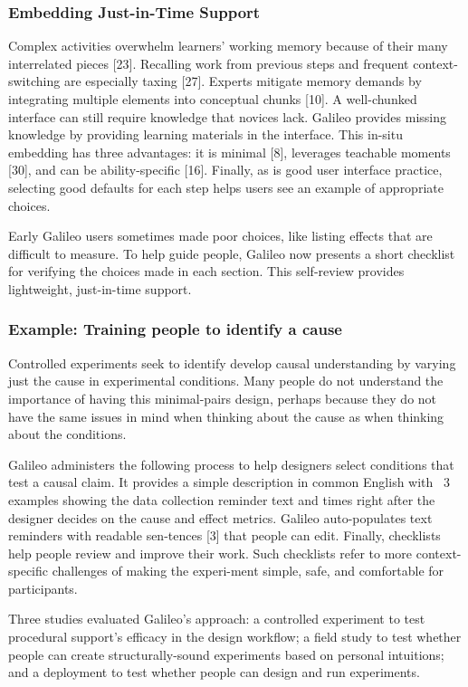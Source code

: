\subsubsection{Embedding Just-in-Time Support}
Complex activities overwhelm learners’ working memory because of their many interrelated pieces [23]. Recalling work from previous steps and frequent context-switching are especially taxing [27]. Experts mitigate memory demands by integrating multiple elements into conceptual chunks [10]. A well-chunked interface can still require knowledge that novices lack. Galileo provides missing knowledge by providing learning materials in the interface. This in-situ embedding has three advantages: it is minimal [8], leverages teachable moments [30], and can be ability-specific [16]. Finally, as is good user interface practice, selecting good defaults for each step helps users see an example of appropriate choices. 

Early Galileo users sometimes made poor choices, like listing effects that are difficult to measure. To help guide people, Galileo now presents a short checklist for verifying the choices made in each section. This self-review provides lightweight, just-in-time support.

\subsubsection{Example: Training people to identify a cause}
Controlled experiments seek to identify develop causal understanding by varying just the cause in experimental conditions. Many people do not understand the importance of having this minimal-pairs design, perhaps because they do not have the same issues in mind when thinking about the cause as when thinking about the conditions.

Galileo administers the following process to help designers select conditions that test a causal claim. It provides a simple description in common English with ~3 examples showing the data collection reminder text and times right after the designer decides on the cause and effect metrics. Galileo auto-populates text reminders with readable sen-tences [3] that people can edit. Finally, checklists help people review and improve their work. Such checklists refer to more context-specific challenges of making the experi-ment simple, safe, and comfortable for participants.
 
Three studies evaluated Galileo’s approach: a controlled experiment to test procedural support’s efficacy in the design workflow; a field study to test whether people can create structurally-sound experiments based on personal intuitions; and a deployment to test whether people can design and run experiments. 

